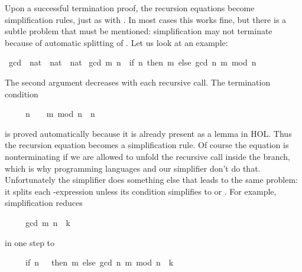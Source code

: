 \begin{isabellebody}
\begin{isamarkuptext}
Upon a successful termination proof, the recursion equations become
simplification rules, just as with .
In most cases this works fine, but there is a subtle
problem that must be mentioned: simplification may not
terminate because of automatic splitting of .
Let us look at an example:%
\end{isamarkuptext}%
\isamarkuptrue%
\isamarkupfalse%
\ gcd\ {}{}\ {}nat\ {}\ nat\ {}\ nat{}\ \isanewline
{}gcd\ m\ n\ {}\ {}if\ n{}{}\ then\ m\ else\ gcd\ n\ {}m\ mod\ n{}{}{}%
\begin{isamarkuptext}%
\noindent
The second argument decreases with each recursive call.
The termination condition
\begin{isabelle}%
\ \ \ \ \ n\ {}\ {}\ {}\ m\ mod\ n\ {}\ n%
\end{isabelle}
is proved automatically because it is already present as a lemma in
HOL\@.  Thus the recursion equation becomes a simplification
rule. Of course the equation is nonterminating if we are allowed to unfold
the recursive call inside the  branch, which is why programming
languages and our simplifier don't do that. Unfortunately the simplifier does
something else that leads to the same problem: it splits 
each -expression unless its
condition simplifies to  or .  For
example, simplification reduces
\begin{isabelle}%
\ \ \ \ \ gcd\ m\ n\ {}\ k%
\end{isabelle}
in one step to
\begin{isabelle}%
\ \ \ \ \ {}if\ n\ {}\ {}\ then\ m\ else\ gcd\ n\ {}m\ mod\ n{}{}\ {}\ k%

\end{isabelle}
\end{isamarkuptext}
\end{isabellebody}
